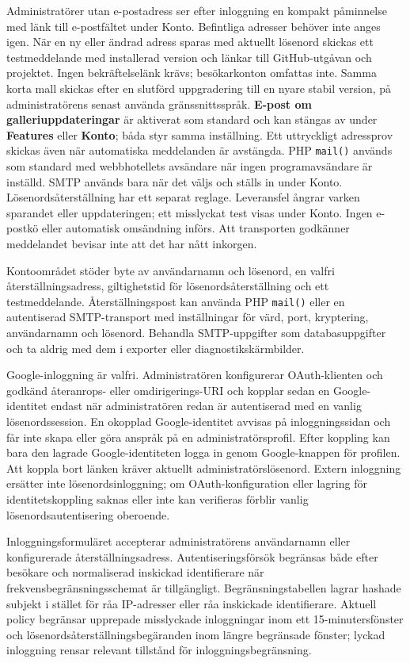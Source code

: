 \documentclass[11pt,a4paper]{article}
\newcommand{\ui}[1]{\textbf{#1}}
\newcommand{\codeword}[1]{\nolinkurl{#1}}
\begin{document}
Administratörer utan e-postadress ser efter inloggning en kompakt påminnelse
med länk till e-postfältet under Konto. Befintliga adresser behöver inte anges
igen. När en ny eller ändrad adress sparas med aktuellt lösenord skickas ett
testmeddelande med installerad version och länkar till GitHub-utgåvan och
projektet. Ingen bekräftelselänk krävs; besökarkonton omfattas inte. Samma korta
mall skickas efter en slutförd uppgradering till en nyare stabil version, på
administratörens senast använda gränssnittsspråk.
\ui{E-post om galleriuppdateringar} är aktiverat som standard och kan stängas av
under \ui{Features} eller \ui{Konto}; båda styr samma inställning. Ett uttryckligt
adressprov skickas även när automatiska meddelanden är avstängda. PHP
\codeword{mail()} används som standard med webbhotellets avsändare när ingen
programavsändare är inställd. SMTP används bara när det väljs och ställs in
under Konto. Lösenordsåterställning har ett separat reglage. Leveransfel ångrar
varken sparandet eller uppdateringen; ett misslyckat test visas under Konto.
Ingen e-postkö eller automatisk omsändning införs. Att transporten godkänner
meddelandet bevisar inte att det har nått inkorgen.

Kontoområdet stöder byte av användarnamn och lösenord, en valfri
återställningsadress, giltighetstid för lösenordsåterställning och ett
testmeddelande. Återställningspost kan använda PHP \codeword{mail()} eller en
autentiserad SMTP-transport med inställningar för värd, port, kryptering,
användarnamn och lösenord. Behandla SMTP-uppgifter som databasuppgifter och ta
aldrig med dem i exporter eller diagnostikskärmbilder.

Google-inloggning är valfri. Administratören konfigurerar OAuth-klienten och
godkänd återanrops- eller omdirigerings-URI och kopplar sedan en
Google-identitet endast när administratören redan är autentiserad med en vanlig
lösenordssession. En okopplad Google-identitet avvisas på inloggningssidan och
får inte skapa eller göra anspråk på en administratörsprofil. Efter koppling kan
bara den lagrade Google-identiteten logga in genom Google-knappen för profilen.
Att koppla bort länken kräver aktuellt administratörslösenord. Extern inloggning
ersätter inte lösenordsinloggning; om OAuth-konfiguration eller lagring för
identitetskoppling saknas eller inte kan verifieras förblir vanlig
lösenordsautentisering oberoende.

Inloggningsformuläret accepterar administratörens användarnamn eller
konfigurerade återställningsadress. Autentiseringsförsök begränsas både efter
besökare och normaliserad inskickad identifierare när
frekvensbegränsningsschemat är tillgängligt. Begränsningstabellen lagrar hashade
subjekt i stället för råa IP-adresser eller råa inskickade identifierare.
Aktuell policy begränsar upprepade misslyckade inloggningar inom ett
15-minutersfönster och lösenordsåterställningsbegäranden inom längre begränsade
fönster; lyckad inloggning rensar relevant tillstånd för inloggningsbegränsning.
\end{document}

